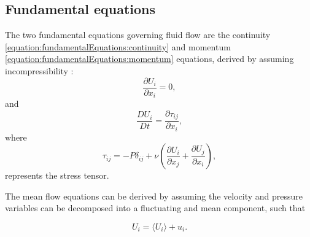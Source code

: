 \documentclass[12pt,oneside,a4paper]{article}
\newcommand{\pdev}[2]{\frac{\partial {#1}}{\partial {#2}}}
\newcommand{\Ddev}[2]{\frac{D {#1}}{D {#2}}}
\begin{document}
\subsection{Fundamental equations}
The two fundamental equations governing fluid flow are the continuity \eqref{equation:fundamentalEquations:continuity} and momentum \eqref{equation:fundamentalEquations:momentum} equations, derived by assuming incompressibility \citep{pope2001}:
\begin{equation}
\pdev{U_i}{x_i}=0,
\label{equation:fundamentalEquations:continuity}
\end{equation}
and
\begin{equation}
\Ddev{U_i}{t}
=
\pdev{\tau_{ij}}{x_i},
\label{equation:fundamentalEquations:momentum}
\end{equation}
where 
\begin{equation}
\tau_{ij}
=
-P\delta_{ij}
+
\nu\left( \pdev{U_i}{x_j}+\pdev{U_j}{x_i} \right),
\label{equation:fundamentalEquations:stressTensor}
\end{equation}
represents the stress tensor. 

The mean flow equations can be derived by assuming the velocity and pressure variables can be decomposed into a fluctuating and mean component, such that

\begin{equation}
U_i = \langle U_i \rangle + u_i.
\label{equation:fundamentalEquations:ReynoldsDecomposition}
\end{equation}
\end{document}
